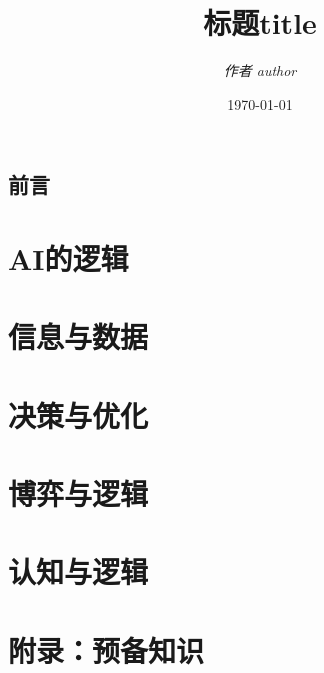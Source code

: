 \documentclass[10pt,oneside,fontset=none]{ctexbook}
\title{\bfseries\Huge 标题title}
\author{\itshape\Large 作者 author}
\date{\today}
\begin{document}
\frontmatter
\pagestyle{empty}
\maketitle
\cleardoublepage
\setcounter{page}{1}
\chapter{前言}
\tableofcontents
\mainmatter
\pagestyle{plain}

\part{AI的逻辑}\label{part:AI-logic}



\part{信息与数据}\label{part:information-data}




\part{决策与优化}\label{part:decision-optimization}




\part{博弈与逻辑}\label{part:logic-game}


\part{认知与逻辑}\label{part:cognitive-logic}



\appendix
\part{附录：预备知识}




\backmatter


\end{document}
